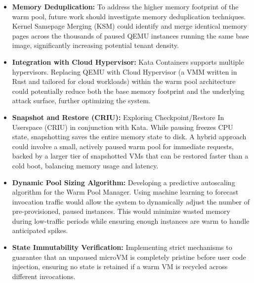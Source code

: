 \documentclass[12pt,a4paper]{report}
\begin{document}
\begin{itemize}
    \item \textbf{Memory Deduplication:} To address the higher memory footprint of the warm pool, future work should investigate memory deduplication techniques. Kernel Samepage Merging (KSM) could identify and merge identical memory pages across the thousands of paused QEMU instances running the same base image, significantly increasing potential tenant density.

    \item \textbf{Integration with Cloud Hypervisor:} Kata Containers supports multiple hypervisors. Replacing QEMU with Cloud Hypervisor (a VMM written in Rust and tailored for cloud workloads) within the warm pool architecture could potentially reduce both the base memory footprint and the underlying attack surface, further optimizing the system.

    \item \textbf{Snapshot and Restore (CRIU):} Exploring Checkpoint/Restore In Userspace (CRIU) in conjunction with Kata. While pausing freezes CPU state, snapshotting saves the entire memory state to disk. A hybrid approach could involve a small, actively paused warm pool for immediate requests, backed by a larger tier of snapshotted VMs that can be restored faster than a cold boot, balancing memory usage and latency.

    \item \textbf{Dynamic Pool Sizing Algorithm:} Developing a predictive autoscaling algorithm for the Warm Pool Manager. Using machine learning to forecast invocation traffic would allow the system to dynamically adjust the number of pre-provisioned, paused instances. This would minimize wasted memory during low-traffic periods while ensuring enough instances are warm to handle anticipated spikes.

    \item \textbf{State Immutability Verification:} Implementing strict mechanisms to guarantee that an unpaused microVM is completely pristine before user code injection, ensuring no state is retained if a warm VM is recycled across different invocations.
\end{itemize}

\vspace{1.5cm}
\lipsum[81-100]

\clearpage{}



\end{document}
